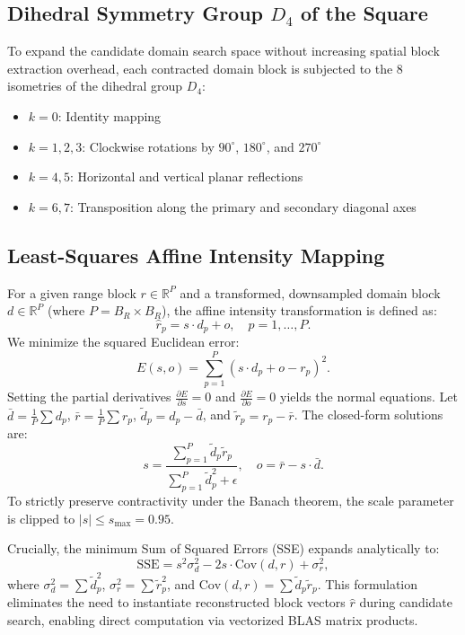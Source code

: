 \documentclass[11pt,a4paper]{article}
\begin{document}
\subsection{Dihedral Symmetry Group $D_4$ of the Square}
To expand the candidate domain search space without increasing spatial block extraction overhead, each contracted domain block is subjected to the 8 isometries of the dihedral group $D_4$:
\begin{itemize}
    \item $k=0$: Identity mapping
    \item $k=1, 2, 3$: Clockwise rotations by $90^\circ$, $180^\circ$, and $270^\circ$
    \item $k=4, 5$: Horizontal and vertical planar reflections
    \item $k=6, 7$: Transposition along the primary and secondary diagonal axes
\end{itemize}

\subsection{Least-Squares Affine Intensity Mapping}
For a given range block $r \in \mathbb{R}^P$ and a transformed, downsampled domain block $d \in \mathbb{R}^P$ (where $P = B_R \times B_R$), the affine intensity transformation is defined as:
\begin{equation}
    \hat{r}_p = s \cdot d_p + o, \quad p = 1, \dots, P.
\end{equation}
We minimize the squared Euclidean error:
\begin{equation}
    E(s, o) = \sum_{p=1}^P (s \cdot d_p + o - r_p)^2.
\end{equation}
Setting the partial derivatives $\frac{\partial E}{\partial s} = 0$ and $\frac{\partial E}{\partial o} = 0$ yields the normal equations. Let $\bar{d} = \frac{1}{P}\sum d_p$, $\bar{r} = \frac{1}{P}\sum r_p$, $\tilde{d}_p = d_p - \bar{d}$, and $\tilde{r}_p = r_p - \bar{r}$. The closed-form solutions are:
\begin{equation}
    s = \frac{\sum_{p=1}^P \tilde{d}_p \tilde{r}_p}{\sum_{p=1}^P \tilde{d}_p^2 + \epsilon}, \quad o = \bar{r} - s \cdot \bar{d}.
\end{equation}
To strictly preserve contractivity under the Banach theorem, the scale parameter is clipped to $|s| \le s_{\max} = 0.95$. 

Crucially, the minimum Sum of Squared Errors (SSE) expands analytically to:
\begin{equation}
    \text{SSE} = s^2 \sigma_d^2 - 2 s \cdot \text{Cov}(d, r) + \sigma_r^2,
\end{equation}
where $\sigma_d^2 = \sum \tilde{d}_p^2$, $\sigma_r^2 = \sum \tilde{r}_p^2$, and $\text{Cov}(d, r) = \sum \tilde{d}_p \tilde{r}_p$. This formulation eliminates the need to instantiate reconstructed block vectors $\hat{r}$ during candidate search, enabling direct computation via vectorized BLAS matrix products.
\end{document}
